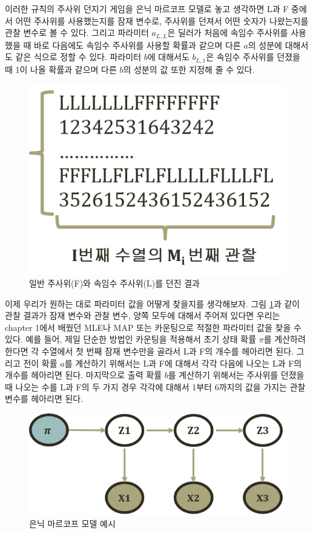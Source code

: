\documentclass[a4paper]{oblivoir}
\begin{document}
이러한 규칙의 주사위 던지기 게임을 은닉 마르코프 모델로 놓고 생각하면 L과 F 중에서 어떤 주사위를 사용했는지를 잠재 변수로, 주사위를 던져서 어떤 숫자가 나왔는지를 관찰 변수로 볼 수 있다. 그리고 파라미터 $a_{L,L}$은 딜러가 처음에 속임수 주사위를 사용했을 때 바로 다음에도 속임수 주사위를 사용할 확률과 같으며 다른 $a$의 성분에 대해서도 같은 식으로 정할 수 있다. 파라미터 $b$에 대해서도 $b_{L,1}$은 속임수 주사위를 던졌을 때 1이 나올 확률과 같으며 다른 $b$의 성분의 값 또한 지정해 줄 수 있다. \\

\begin{figure}[ht] \centering 
\includegraphics[scale=1.0]{fig9_8.png} 
\caption{일반 주사위(F)와 속임수 주사위(L)를 던진 결과}
\label{fig:9-8}
\end{figure}

이제 우리가 원하는 대로 파라미터 값을 어떻게 찾을지를 생각해보자. 그림 \ref{fig:9-8}과 같이 관찰 결과가 잠재 변수와 관찰 변수, 양쪽 모두에 대해서 주어져 있다면 우리는 chapter 1에서 배웠던 MLE나 MAP 또는 카운팅으로 적절한 파라미터 값을 찾을 수 있다. 예를 들어, 제일 단순한 방법인 카운팅을 적용해서 초기 상태 확률 $\pi$를 계산하려 한다면 각 수열에서 첫 번째 잠재 변수만을 골라서 L과 F의 개수를 헤아리면 된다. 그리고 전이 확률 $a$를 계산하기 위해서는 L과 F에 대해서 각각 다음에 나오는 L과 F의 개수를 헤아리면 된다. 마지막으로 출력 확률 $b$를 계산하기 위해서는 주사위를 던졌을 때 나오는 수를 L과 F의 두 가지 경우 각각에 대해서 1부터 6까지의 값을 가지는 관찰 변수를 헤아리면 된다. \\

\begin{figure}[ht] \centering 
\includegraphics[scale=0.45]{fig9_9.png} 
\caption{은닉 마르코프 모델 예시}
\label{fig:9-9}
\end{figure}
\end{document}

